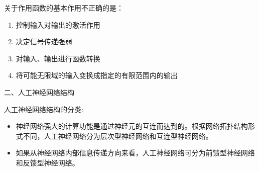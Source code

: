 \begin{example}
    关于作用函数的基本作用不正确的是：
    \begin{enumerate}[A]
        \item 控制输入对输出的激活作用
        \item \textcolor{main1}{决定信号传递强弱}
        \item 对输入、输出进行函数转换
        \item 将可能无限域的输入变换成指定的有限范围内的输出
    \end{enumerate}
\end{example}

\textcolor{main1}{二、人工神经网络结构}

\begin{note}
    人工神经网络结构的分类:
    \begin{itemize}
        \item 神经网络强大的计算功能是通过神经元的互连而达到的。根据网络拓扑结构形式不同，人工神经网络分为\textcolor{main1}{层次型神经网络}和\textcolor{main1}{互连型神经网络}。
        \item 如果从神经网络内部信息传递方向来看，人工神经网络可分为\textcolor{main1}{前馈型神经网络}和\textcolor{main1}{反馈型神经网络}。
    \end{itemize}
\end{note}
